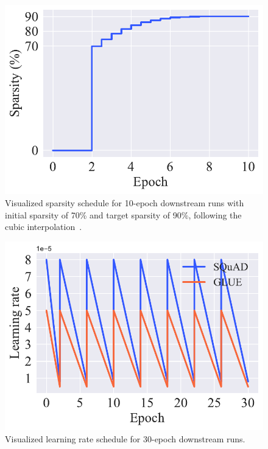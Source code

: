 \documentclass[11pt]{article}
\begin{document}
\begin{figure}[htb!]
    \centering
    \includegraphics[scale=0.5]{media/sparsity90_10ep.pdf}
    \caption{Visualized sparsity schedule for 10-epoch downstream runs with initial sparsity of 70\% and target sparsity of 90\%, following the cubic interpolation~\cite{Zhu2018ToPO}.}
    \label{fig:spars90_ep10}
\end{figure}

\begin{figure}[htb!]
    \centering
    \includegraphics[scale=0.5]{media/LR_30ep.pdf}
    \caption{Visualized learning rate schedule for 30-epoch downstream runs.}
    \label{fig:lr_30ep}
\end{figure}
\end{document}
